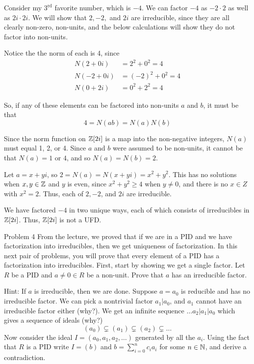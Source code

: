 \documentclass{hmwk}
\begin{document}
\begin{solution}

\pre Consider my $3^\text{rd}$ favorite number, which is $-4$. We can factor $-4$ as $-2 \cdot 2$ as well as $2i \cdot 2i$. We will show that $2, -2,$ and $2i$ are irreducible, since they are all clearly non-zero, non-units, and the below calculations will show they do not factor into non-units.

\pre Notice the the norm of each is 4, since 
\begin{align*}
    N(2 + 0i) &= 2^2 + 0^2 = 4 \\
    N(-2 + 0i) &= (-2)^2 + 0^2 = 4 \\
    N(0 + 2i) &= 0^2 + 2^2 = 4
\end{align*}

\pre So, if any of these elements can be factored into non-units $a$ and $b$, it must be that $$4 = N(ab) = N(a)N(b)$$

\pre Since the norm function on $\mathbb{Z}[2i]$ is a map into the non-negative integers, $N(a)$ must equal 1, 2, or 4. Since $a$ and $b$ were assumed to be non-units, it cannot be that $N(a) = 1$ or $4$, and so $N(a) = N(b) = 2$. 

\pre Let $a = x + yi$, so $2 = N(a) = N(x + yi) = x^2 + y^2$. This has no solutions when $x, y \in \mathbb{Z}$ and $y$ is even, since $x^2 + y^2 \geq 4$ when $y \neq 0$, and there is no $x \in Z$ with $x^2 = 2$. Thus, each of $2, -2$, and $2i$ are irreducible. 

\pre We have factored $-4$ in two unique ways, each of which consists of irreducibles in $\mathbb{Z}[2i]$. Thus, $\mathbb{Z}[2i]$ is not a UFD. 
\end{solution}

\begin{problem}{Problem 4}
From the lecture, we proved that if we are in a PID and we have factorization into irreducibles, then we get uniqueness of factorization. In this next pair of problems, you will prove that every element of a PID has a factorization into irreducibles. First, start by showing we get a single factor. Let $R$ be a PID and $a \neq 0 \in R$ be a non-unit. Prove that $a$ has an irreducible factor.  

\pre Hint: If $a$ is irreducible, then we are done. Suppose $a = a_0$ is reducible and has no irreducible factor. We can pick a nontrivial factor $a_1 | a_0$, and $a_1$ cannot have an irreducible factor either (why?). We get an infinite sequence $ \dots a_2 |a _1 |a_0$ which gives a sequence of ideals (why?) \[ (a_0) \subsetneq (a_1) \subsetneq (a_2) \subsetneq \dots\] Now consider the ideal $I = (a_0, a_1, a_2, \dots)$ generated by all the $a_i$. Using the fact that $R$ is a PID write $I = (b)$ and $b = \sum_{i=0}^n c_ia_i$ for some $n \in \mathbb{N}$, and derive a contradiction.
\end{problem}
\end{document}
